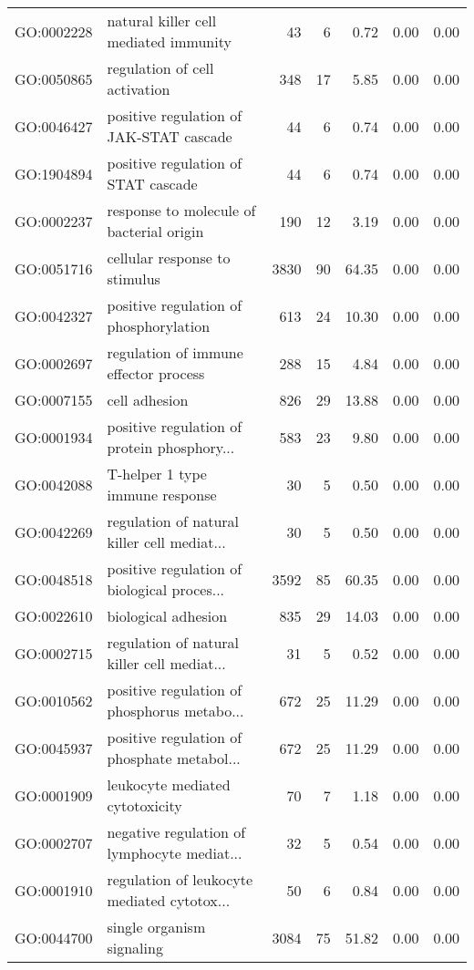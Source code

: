 \begin{table}[ht]
\begin{tabular}{llrrrrr}
  GO:0002228 & natural killer cell mediated immunity &  43 &   6 & 0.72 & 0.00 & 0.00 \\ 
  GO:0050865 & regulation of cell activation & 348 &  17 & 5.85 & 0.00 & 0.00 \\ 
  GO:0046427 & positive regulation of JAK-STAT cascade &  44 &   6 & 0.74 & 0.00 & 0.00 \\ 
  GO:1904894 & positive regulation of STAT cascade &  44 &   6 & 0.74 & 0.00 & 0.00 \\ 
  GO:0002237 & response to molecule of bacterial origin & 190 &  12 & 3.19 & 0.00 & 0.00 \\ 
  GO:0051716 & cellular response to stimulus & 3830 &  90 & 64.35 & 0.00 & 0.00 \\ 
  GO:0042327 & positive regulation of phosphorylation & 613 &  24 & 10.30 & 0.00 & 0.00 \\ 
  GO:0002697 & regulation of immune effector process & 288 &  15 & 4.84 & 0.00 & 0.00 \\ 
  GO:0007155 & cell adhesion & 826 &  29 & 13.88 & 0.00 & 0.00 \\ 
  GO:0001934 & positive regulation of protein phosphory... & 583 &  23 & 9.80 & 0.00 & 0.00 \\ 
  GO:0042088 & T-helper 1 type immune response &  30 &   5 & 0.50 & 0.00 & 0.00 \\ 
  GO:0042269 & regulation of natural killer cell mediat... &  30 &   5 & 0.50 & 0.00 & 0.00 \\ 
  GO:0048518 & positive regulation of biological proces... & 3592 &  85 & 60.35 & 0.00 & 0.00 \\ 
  GO:0022610 & biological adhesion & 835 &  29 & 14.03 & 0.00 & 0.00 \\ 
  GO:0002715 & regulation of natural killer cell mediat... &  31 &   5 & 0.52 & 0.00 & 0.00 \\ 
  GO:0010562 & positive regulation of phosphorus metabo... & 672 &  25 & 11.29 & 0.00 & 0.00 \\ 
  GO:0045937 & positive regulation of phosphate metabol... & 672 &  25 & 11.29 & 0.00 & 0.00 \\ 
  GO:0001909 & leukocyte mediated cytotoxicity &  70 &   7 & 1.18 & 0.00 & 0.00 \\ 
  GO:0002707 & negative regulation of lymphocyte mediat... &  32 &   5 & 0.54 & 0.00 & 0.00 \\ 
  GO:0001910 & regulation of leukocyte mediated cytotox... &  50 &   6 & 0.84 & 0.00 & 0.00 \\ 
  GO:0044700 & single organism signaling & 3084 &  75 & 51.82 & 0.00 & 0.00 \\ 

\end{tabular}
\end{table}
